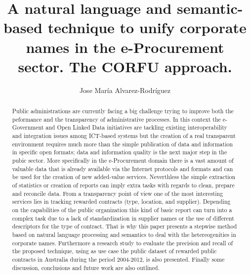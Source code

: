 \documentclass{llncs}
\begin{document}
\title{A natural language and semantic-based technique to unify corporate names in the e-Procurement sector. The CORFU approach.}

\titlerunning{}

\author{Jose Mar\'{i}a Alvarez-Rodr\'{i}guez} 







\date{}

\maketitle

\renewcommand{\labelitemi}{$\bullet$}

\begin{abstract}
Public administrations are currently facing a big challenge trying to improve both the peformance and the transparency of administrative processes.
In this context the e-Government and Open Linked Data initiatives are tackling existing interoperability and 
integration issues among ICT-based systems but the creation of a real transparent environment requires 
much more than the simple publication of data and information in specific open formats; data and information 
quality is the next major step in the pubic sector. More specifically in the e-Procurement domain there is a 
vast amount of valuable data that is already available via the Internet protocols and formats and can be used 
for the creation of new added-value services. Neverthless the simple extraction of statistics or creation of reports 
can imply extra tasks with regards to clean, prepare and reconcile data. 
From a transparency point of view one of the most interesting services lies in tracking rewarded contracts (type, location, and supplier). 
Depending on the capabilities of the public organization this kind of basic report can turn into a 
complex task due to a lack of standardization in supplier names or the use of different descriptors for the type of contract. That is why 
this paper presents a stepwise method based on natural language processing and semantics to deal with the hetereogenities in corporate names. 
Furthermore a research study to evaluate the precision and recall of the proposed technique, using as use case the public dataset of rewarded public 
contracts in Australia during the period 2004-2012, is also presented. Finally some discussion, 
conclusions and future work are also outlined.
\end{abstract}
\end{document}
